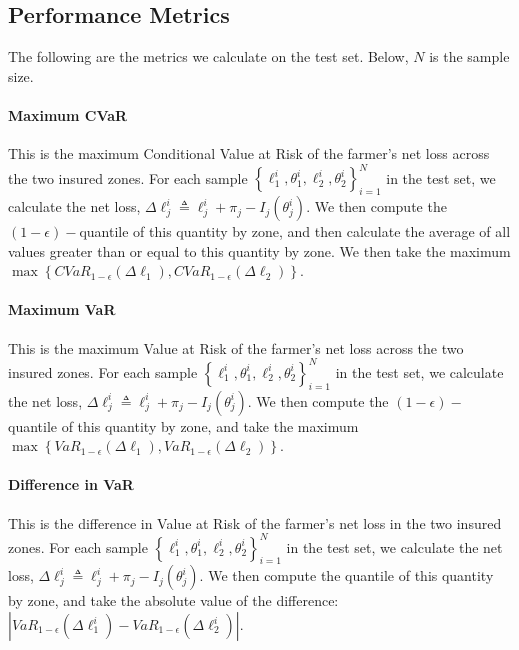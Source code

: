 \documentclass[11pt]{article}
\begin{document}
 \subsection{Performance Metrics}
   The following are the metrics we calculate on the test set. Below, $N$ is the sample size. 

   \paragraph*{Maximum CVaR} This is the maximum Conditional Value at Risk of the farmer's net loss across the two insured zones. For each sample $\left \{\ell^i_1,\theta^i_1, \ell^i_2, \theta^i_2 \right \}_{i=1}^N$ in the test set, we calculate the net loss, $\Delta \ell^i_j \triangleq  \ell^i_j +\pi_j - I_j(\theta^i_j)$. We then compute the  $(1-\epsilon)-$quantile of this quantity by zone, and then calculate the average of all values greater than or equal to this quantity by zone. We then take the maximum $\max \left \{ CVaR_{1-\epsilon} \left ( \Delta \ell_1 \right ), CVaR_{1-\epsilon} \left ( \Delta \ell_2 \right ) \right \}$. 

   \paragraph*{Maximum VaR} This is the maximum Value at Risk of the farmer's net loss across the two insured zones. For each sample $\left \{\ell^i_1,\theta^i_1, \ell^i_2, \theta^i_2 \right \}_{i=1}^N$ in the test set, we calculate the net loss, $\Delta \ell^i_j \triangleq  \ell^i_j +\pi_j - I_j(\theta^i_j)$. We then compute the  $(1-\epsilon)-$quantile of this quantity by zone, and take the maximum $\max \left \{ VaR_{1-\epsilon} \left ( \Delta \ell_1 \right ), VaR_{1-\epsilon} \left ( \Delta \ell_2 \right ) \right \}$.

   \paragraph*{Difference in VaR} This is the difference in Value at Risk of the farmer's net loss in the two insured zones. For each sample $\left \{\ell^i_1,\theta^i_1, \ell^i_2, \theta^i_2 \right \}_{i=1}^N$ in the test set, we calculate the net loss, $\Delta \ell^i_j \triangleq  \ell^i_j +\pi_j - I_j(\theta^i_j)$. We then compute the quantile of this quantity by zone, and take the absolute value of the difference: $\left |VaR_{1-\epsilon}\left ( \Delta \ell^i_1 \right ) - VaR_{1-\epsilon} \left ( \Delta \ell^i_2 \right ) \right |$.
\end{document}
